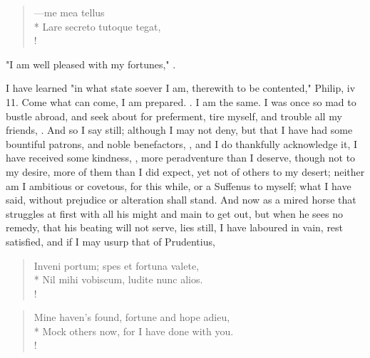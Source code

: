 {%
\begin{latin}%
\begin{verse}%
---me mea tellus\\*
Lare secreto tutoque tegat,\\!
\end{verse}%
\end{latin}%

"I am well pleased with my fortunes," .

I have learned "in what state soever I am, therewith to be contented," Philip, iv 11. Come what can come, I am prepared. . I am the same. I was once so mad to bustle abroad, and seek about for preferment, tire myself, and trouble all my friends, . And so I say still; although I may not deny, but that I have had some bountiful patrons, and noble benefactors, , and I do thankfully acknowledge it, I have received some kindness, , more peradventure than I deserve, though not to my desire, more of them than I did expect, yet not of others to my desert; neither am I ambitious or covetous, for this while, or a Suffenus to myself; what I have said, without prejudice or alteration shall stand. And now as a mired horse that struggles at first with all his might and main to get out, but when he sees no remedy, that his beating will not serve, lies still, I have laboured in vain, rest satisfied, and if I may usurp that of Prudentius,

\begin{latin}%
\begin{verse}%
Inveni portum; spes et fortuna valete,\\*
Nil mihi vobiscum, ludite nunc alios.\\!
\end{verse}%
\end{latin}%
\translationrule%
\begin{verse}%
Mine haven's found, fortune and hope adieu,\\*
Mock others now, for I have done with you.\\!
\end{verse}%



}
